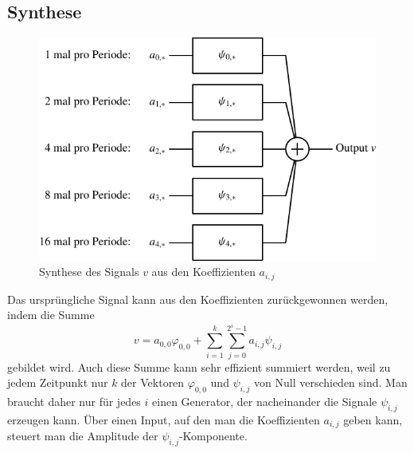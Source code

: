 \subsection{Synthese}
\begin{figure}
\begin{center}
\includegraphics[width=0.8\hsize]{images/signal-3}
\end{center}
\caption{Synthese des Signals $v$ aus den Koeffizienten $a_{i,j}$
\label{waveletsynthesis}}
\end{figure}
Das ursprüngliche Signal kann aus den Koeffizienten zurückgewonnen werden,
indem die Summe
$$
v=a_{0,0}\varphi_{0,0}+\sum_{i=1}^k\sum_{j=0}^{2^i-1}a_{i,j}\psi_{i,j}
$$
gebildet wird. 
Auch diese Summe kann sehr effizient summiert werden, weil zu jedem
Zeitpunkt nur $k$ der Vektoren $\varphi_{0,0}$ und $\psi_{i,j}$
von Null verschieden sind.
Man braucht daher nur für jedes $i$ einen Generator, der
nacheinander die Signale $\psi_{i,j}$ erzeugen kann. Über
einen Input, auf den man die Koeffizienten $a_{i,j}$ geben
kann, steuert man die Amplitude der $\psi_{i,j}$-Komponente.

